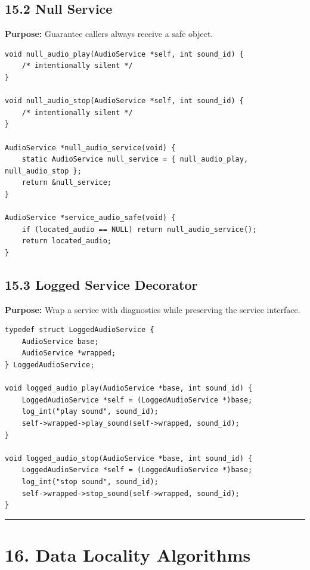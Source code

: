 \documentclass[10pt,letterpaper]{article}
\begin{document}
\subsection{15.2 Null Service}

\textbf{Purpose:} Guarantee callers always receive a safe object.

\begin{verbatim}
void null_audio_play(AudioService *self, int sound_id) {
    /* intentionally silent */
}

void null_audio_stop(AudioService *self, int sound_id) {
    /* intentionally silent */
}

AudioService *null_audio_service(void) {
    static AudioService null_service = { null_audio_play, null_audio_stop };
    return &null_service;
}

AudioService *service_audio_safe(void) {
    if (located_audio == NULL) return null_audio_service();
    return located_audio;
}
\end{verbatim}

\subsection{15.3 Logged Service Decorator}

\textbf{Purpose:} Wrap a service with diagnostics while preserving the service interface.

\begin{verbatim}
typedef struct LoggedAudioService {
    AudioService base;
    AudioService *wrapped;
} LoggedAudioService;

void logged_audio_play(AudioService *base, int sound_id) {
    LoggedAudioService *self = (LoggedAudioService *)base;
    log_int("play sound", sound_id);
    self->wrapped->play_sound(self->wrapped, sound_id);
}

void logged_audio_stop(AudioService *base, int sound_id) {
    LoggedAudioService *self = (LoggedAudioService *)base;
    log_int("stop sound", sound_id);
    self->wrapped->stop_sound(self->wrapped, sound_id);
}
\end{verbatim}

\medskip\hrule\medskip

\clearpage
\section{16. Data Locality Algorithms}

\end{document}
